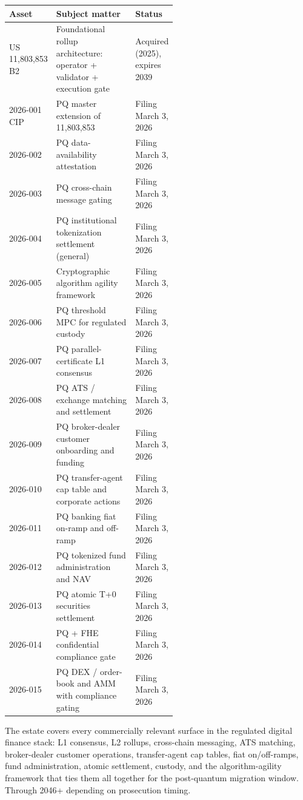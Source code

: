 \documentclass[11pt,letterpaper]{article}
\begin{document}
\begin{longtable}{lp{0.55\linewidth}l}
\toprule
\textbf{Asset} & \textbf{Subject matter} & \textbf{Status} \\
\midrule
US 11,803,853 B2 & Foundational rollup architecture: operator + validator + execution gate & Acquired (2025), expires 2039 \\
2026-001 CIP & PQ master extension of 11,803,853 & Filing March 3, 2026 \\
2026-002 & PQ data-availability attestation & Filing March 3, 2026 \\
2026-003 & PQ cross-chain message gating & Filing March 3, 2026 \\
2026-004 & PQ institutional tokenization settlement (general) & Filing March 3, 2026 \\
2026-005 & Cryptographic algorithm agility framework & Filing March 3, 2026 \\
2026-006 & PQ threshold MPC for regulated custody & Filing March 3, 2026 \\
2026-007 & PQ parallel-certificate L1 consensus & Filing March 3, 2026 \\
2026-008 & PQ ATS / exchange matching and settlement & Filing March 3, 2026 \\
2026-009 & PQ broker-dealer customer onboarding and funding & Filing March 3, 2026 \\
2026-010 & PQ transfer-agent cap table and corporate actions & Filing March 3, 2026 \\
2026-011 & PQ banking fiat on-ramp and off-ramp & Filing March 3, 2026 \\
2026-012 & PQ tokenized fund administration and NAV & Filing March 3, 2026 \\
2026-013 & PQ atomic T+0 securities settlement & Filing March 3, 2026 \\
2026-014 & PQ + FHE confidential compliance gate & Filing March 3, 2026 \\
2026-015 & PQ DEX / order-book and AMM with compliance gating & Filing March 3, 2026 \\
\bottomrule
\end{longtable}

The estate covers every commercially relevant surface in the regulated digital finance stack: L1 consensus, L2 rollups, cross-chain messaging, ATS matching, broker-dealer customer operations, transfer-agent cap tables, fiat on/off-ramps, fund administration, atomic settlement, custody, and the algorithm-agility framework that ties them all together for the post-quantum migration window. Through 2046+ depending on prosecution timing.
\end{document}
